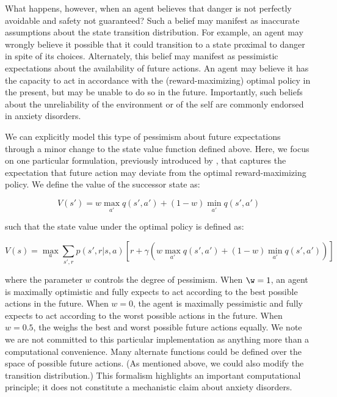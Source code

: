 \documentclass[11pt]{article} %
\begin{document}
What happens, however, when an agent believes that danger is not perfectly avoidable and safety not guaranteed? Such a belief may manifest as inaccurate assumptions about the state transition distribution. For example, an agent may wrongly believe it possible that it could transition to a state proximal to danger in spite of its choices. Alternately, this belief may manifest as pessimistic expectations about the availability of future actions. An agent may believe it has the capacity to act in accordance with the (reward-maximizing) optimal policy in the present, but may be unable to do so in the future. Importantly, such beliefs about the unreliability of the environment or of the self are commonly endorsed in anxiety disorders.

We can explicitly model this type of pessimism about future expectations through a minor change to the state value function defined above. Here, we focus on one particular formulation, previously introduced by \cite{Gaskett2003}, that captures the expectation that future action may deviate from the optimal reward-maximizing policy. We define the value of the successor state as:

$$ V(s') = w \max_{a'} q(s',a') + (1 - w) \min_{a'} q(s',a') $$

such that the state value under the optimal policy is defined as:

$$ V(s) = \max_a \sum_{s',r}p(s',r|s,a) \left[ r + \gamma \left( w \max_{a'} q(s',a') + (1 - w) \min_{a'} q(s',a') \right) \right] $$

where the parameter $w$ controls the degree of pessimism. When $\w = 1$, an agent is maximally optimistic and fully expects to act according to the best possible actions in the future. When $w = 0$, the agent is maximally pessimistic and fully expects to act according to the worst possible actions in the future. When $w = 0.5$, the weighs the best and worst possible future actions equally. We note we are not committed to this particular implementation as anything more than a computational convenience. Many alternate functions could be defined over the space of possible future actions. (As mentioned above, we could also modify the transition distribution.) This formalism highlights an important computational principle; it does not constitute a mechanistic claim about anxiety disorders.
\end{document}
